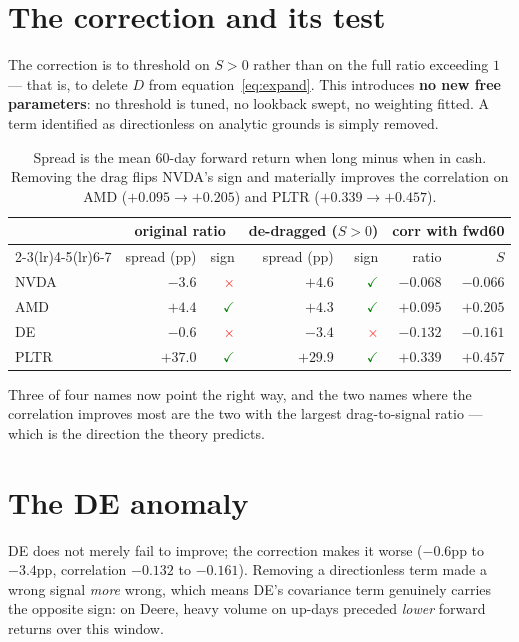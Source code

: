 \documentclass[11pt,a4paper]{article}
\begin{document}
\section{The correction and its test}

The correction is to threshold on $S > 0$ rather than on the full ratio exceeding $1$ ---
that is, to delete $D$ from equation~\eqref{eq:expand}. This introduces \textbf{no new free
parameters}: no threshold is tuned, no lookback swept, no weighting fitted. A term identified
as directionless on analytic grounds is simply removed.

\begin{table}[H]
\centering
\small
\begin{tabular}{lrrrrrr}
\toprule
& \multicolumn{2}{c}{\textbf{original ratio}} & \multicolumn{2}{c}{\textbf{de-dragged ($S>0$)}}
& \multicolumn{2}{c}{\textbf{corr with fwd60}} \\
\cmidrule(lr){2-3}\cmidrule(lr){4-5}\cmidrule(lr){6-7}
& spread (pp) & sign & spread (pp) & sign & ratio & $S$ \\
\midrule
NVDA & $-3.6$  & \textcolor{red}{$\times$} & $+4.6$  & \textcolor{green}{$\checkmark$} & $-0.068$ & $-0.066$ \\
AMD  & $+4.4$  & \textcolor{green}{$\checkmark$} & $+4.3$  & \textcolor{green}{$\checkmark$} & $+0.095$ & $+0.205$ \\
DE   & $-0.6$  & \textcolor{red}{$\times$} & $-3.4$  & \textcolor{red}{$\times$} & $-0.132$ & $-0.161$ \\
PLTR & $+37.0$ & \textcolor{green}{$\checkmark$} & $+29.9$ & \textcolor{green}{$\checkmark$} & $+0.339$ & $+0.457$ \\
\bottomrule
\end{tabular}
\caption{Spread is the mean 60-day forward return when long minus when in cash. Removing the
drag flips NVDA's sign and materially improves the correlation on AMD ($+0.095 \to +0.205$)
and PLTR ($+0.339 \to +0.457$).}
\label{tab:fix}
\end{table}

Three of four names now point the right way, and the two names where the correlation improves
most are the two with the largest drag-to-signal ratio --- which is the direction the theory
predicts.

\section{The DE anomaly}

DE does not merely fail to improve; the correction makes it worse ($-0.6$pp to $-3.4$pp,
correlation $-0.132$ to $-0.161$). Removing a directionless term made a wrong signal
\emph{more} wrong, which means DE's covariance term genuinely carries the opposite sign: on
Deere, heavy volume on up-days preceded \emph{lower} forward returns over this window.
\end{document}
